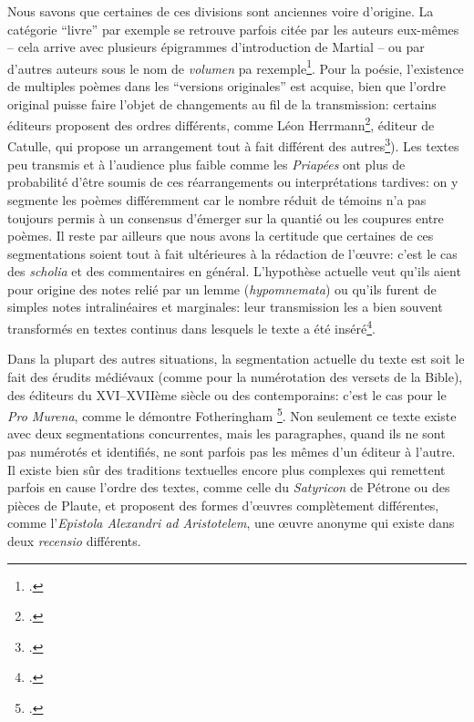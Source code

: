 Nous savons que certaines de ces divisions sont anciennes voire d'origine. La catégorie \enquote{livre} par exemple se retrouve parfois citée par les auteurs eux-mêmes -- cela arrive avec plusieurs épigrammes d'introduction de Martial -- ou par d'autres auteurs sous le nom de \textit{volumen} pa rexemple\footcite[p. 13]{canfora_conservazione_2016}. Pour la poésie, l'existence de multiples poèmes dans les \enquote{versions originales} est acquise, bien que l'ordre original puisse faire l'objet de changements au fil de la transmission: certains éditeurs proposent des ordres différents, comme Léon Herrmann\footcite{catulle_les_1957}, éditeur de Catulle, qui propose un arrangement tout à fait différent des autres\footcite{catulle_poesies_1932}). Les textes peu transmis et à l'audience plus faible comme les \textit{Priapées} ont plus de probabilité d'être soumis de ces réarrangements ou interprétations tardives: on y segmente les poèmes différemment car le nombre réduit de témoins n'a pas toujours permis à un consensus d'émerger sur la quantié ou les coupures entre poèmes. Il reste par ailleurs que nous avons la certitude que certaines de ces segmentations soient tout à fait ultérieures à la rédaction de l'œuvre: c'est le cas des \textit{scholia} et des commentaires en général. L'hypothèse actuelle veut qu'ils aient pour origine des notes relié par un lemme (\textit{hypomnemata}) ou qu'ils furent de simples notes intralinéaires et marginales: leur transmission les a bien souvent transformés en textes continus dans lesquels le texte a été inséré\footcite{bureau_quelques_2012}. 

Dans la plupart des autres situations, la segmentation actuelle du texte est soit le fait des érudits médiévaux (comme pour la numérotation des versets de la Bible), des éditeurs du XVI--XVIIème siècle ou des contemporains: c'est le cas pour le \textit{Pro Murena}, comme le démontre Fotheringham \footcite{fotheringham_numbers_2007}. Non seulement ce texte existe avec deux segmentations concurrentes, mais les paragraphes, quand ils ne sont pas numérotés et identifiés, ne sont parfois pas les mêmes d'un éditeur à l'autre. Il existe bien sûr des traditions textuelles encore plus complexes qui remettent parfois en cause l'ordre des textes, comme celle du \textit{Satyricon} de Pétrone ou des pièces de Plaute, et proposent des formes d'œuvres complètement différentes, comme l'\textit{Epistola Alexandri ad Aristotelem}, une œuvre anonyme qui existe dans deux \textit{recensio} différents.

